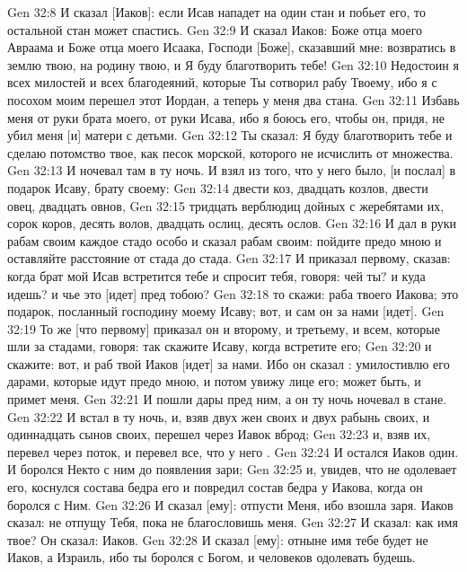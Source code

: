 \vs Gen 32:8 И сказал [Иаков]: если Исав нападет на один стан и побьет его, то остальной стан может спастись.
\vs Gen 32:9 И сказал Иаков: Боже отца моего Авраама и Боже отца моего Исаака, Господи [Боже], сказавший мне: возвратись в землю твою, на родину твою, и Я буду благотворить тебе!
\vs Gen 32:10 Недостоин я всех милостей и всех благодеяний, которые Ты сотворил рабу Твоему, ибо я с посохом моим перешел этот Иордан, а теперь у меня два стана.
\vs Gen 32:11 Избавь меня от руки брата моего, от руки Исава, ибо я боюсь его, чтобы он, придя, не убил меня [и] матери с детьми.
\vs Gen 32:12 Ты сказал: Я буду благотворить тебе и сделаю потомство твое, как песок морской, которого не исчислить от множества.
\vs Gen 32:13 И ночевал там  в ту ночь. И взял из того, что у него было, [и послал] в подарок Исаву, брату своему:
\vs Gen 32:14 двести коз, двадцать козлов, двести овец, двадцать овнов,
\vs Gen 32:15 тридцать верблюдиц дойных с жеребятами их, сорок коров, десять волов, двадцать ослиц, десять ослов.
\vs Gen 32:16 И дал в руки рабам своим каждое стадо особо и сказал рабам своим: пойдите предо мною и оставляйте расстояние от стада до стада.
\vs Gen 32:17 И приказал первому, сказав: когда брат мой Исав встретится тебе и спросит тебя, говоря: чей ты? и куда идешь? и чье это  [идет] пред тобою?
\vs Gen 32:18 то скажи: раба твоего Иакова; это подарок, посланный господину моему Исаву; вот, и сам он за нами [идет].
\vs Gen 32:19 То же [что первому] приказал он и второму, и третьему, и всем, которые шли за стадами, говоря: так скажите Исаву, когда встретите его;
\vs Gen 32:20 и скажите: вот, и раб твой Иаков [идет] за нами. Ибо он сказал : умилостивлю его дарами, которые идут предо мною, и потом увижу лице его; может быть, и примет меня.
\vs Gen 32:21 И пошли дары пред ним, а он ту ночь ночевал в стане.
\vs Gen 32:22 И встал в ту ночь, и, взяв двух жен своих и двух рабынь своих, и одиннадцать сынов своих, перешел через Иавок вброд;
\vs Gen 32:23 и, взяв их, перевел через поток, и перевел все, что у него .
\rsbpar\vs Gen 32:24 И остался Иаков один. И боролся Некто с ним до появления зари;
\vs Gen 32:25 и, увидев, что не одолевает его, коснулся состава бедра его и повредил состав бедра у Иакова, когда он боролся с Ним.
\vs Gen 32:26 И сказал [ему]: отпусти Меня, ибо взошла заря. Иаков сказал: не отпущу Тебя, пока не благословишь меня.
\vs Gen 32:27 И сказал: как имя твое? Он сказал: Иаков.
\vs Gen 32:28 И сказал [ему]: отныне имя тебе будет не Иаков, а Израиль, ибо ты боролся с Богом, и человеков одолевать будешь.
